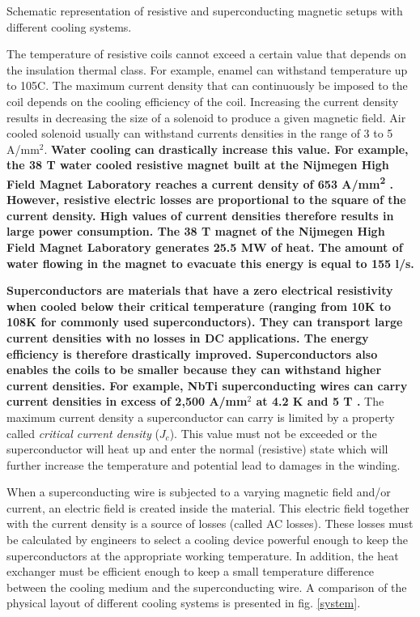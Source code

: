 \documentclass{ws-jmrr}
\begin{document}
\begin{multicols}{2}
\begin{figurehere}
\begin{center}
	\caption{Schematic representation of resistive and superconducting magnetic setups with different cooling systems.}
	\label{system}
	\end{center}
\end{figurehere}
\vspace{20mm}
The temperature of resistive coils cannot exceed a certain value that depends on the insulation thermal class. For example, enamel can withstand temperature up to 105\degree C.
The maximum current density that can continuously be imposed to the coil depends on the cooling efficiency of the coil. Increasing the current density results in decreasing the size of a solenoid to produce a given magnetic field. Air cooled solenoid usually can withstand currents densities in the range of 3 to 5 A/mm$^2$. \textbf{Water cooling can drastically increase this value. For example, the 38 T water cooled resistive magnet built at the Nijmegen High Field Magnet Laboratory reaches a current density of 653 A/mm\textsuperscript{2} \cite{mag1 , mag2}. However, resistive electric losses are proportional to the square of the current density. High values of current densities therefore results in large power consumption. The 38 T magnet of the Nijmegen High Field Magnet Laboratory generates 25.5 MW of heat. The amount of water flowing in the magnet to evacuate this energy is equal to 155 l/s.}\par
\textbf{Superconductors are materials that have a zero electrical resistivity when cooled below their critical temperature (ranging from 10K to 108K for commonly used superconductors). They can transport large current densities with no losses in DC applications. The energy efficiency is therefore drastically improved. Superconductors also enables the coils to be smaller because they can withstand higher current densities. For example, NbTi superconducting wires can carry current densities in excess of 2,500 A/mm$^2$ at 4.2 K and 5 T \cite{muzzi2011test , godeke2007limits}.} The maximum current density a superconductor can carry is limited by a property called \emph{critical current density} ($J_c$). This value must not be exceeded or the superconductor will heat up and enter the normal (resistive) state which will further increase the temperature and potential lead to damages in the winding.\par
When a superconducting wire is subjected to a varying magnetic field and/or current, an electric field is created inside the material. This electric field together with the current density is a source of losses (called AC losses). These losses must be calculated by engineers to select a cooling device powerful enough to keep the superconductors at the appropriate working temperature. In addition, the heat exchanger must be efficient enough to keep a small temperature difference between the cooling medium and the superconducting wire. A comparison of the physical layout of different cooling systems is presented in fig. \ref{system}.\par

\end{multicols}
\end{document}
